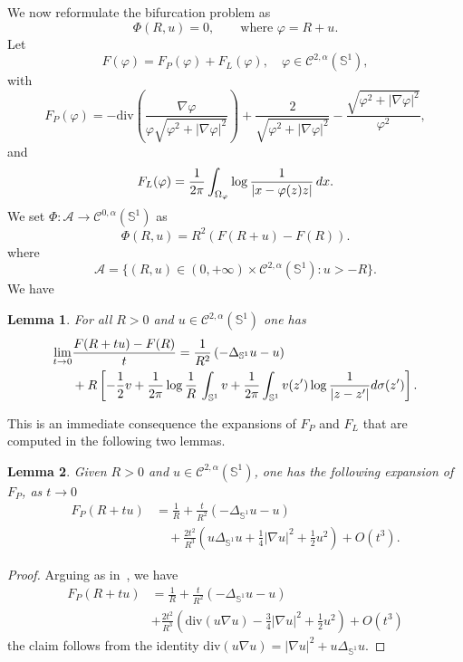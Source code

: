 \documentclass[10pt,reqno,english]{amsart}
\newcommand{\Su}{\mathbb{S}^1}
\newcommand{\be}{\begin{equation}}
\newcommand{\ee}{\end{equation}}
\newtheorem{lemma}{Lemma}[section]
\theoremstyle{definition}
\numberwithin{equation}{section}
\begin{document}
\medskip
We now reformulate the bifurcation problem as
\[
\Phi(R,u)=0, \qquad \text{where } \varphi = R + u .
\]
Let 
\[
F(\varphi)= F_P (\varphi ) + F_L  (\varphi), \quad \varphi\in\mathcal C^{2,\alpha}(\Su),
\]
with
\[
 F_P (\varphi )=    -\mathrm{div}\left(\frac{\nabla\varphi}{\varphi\sqrt{ \varphi^2 + |\nabla \varphi|^2}}\right)+\frac{2}{\sqrt{ \varphi^2 + |\nabla \varphi|^2}}-\frac{\sqrt{ \varphi^2 + |\nabla \varphi|^2}}{\varphi^2} ,
 \]
 and
 \[
 F_L  (\varphi)=  {1\over 2\pi} \int_{\Omega_\varphi}    \log {1 \over |x - \varphi (z)   z| }\, dx.
\]
We set $\Phi:\mathcal A\to\mathcal C^{0,\alpha}(\Su)$ as
\be
\label{defPhi2}
\Phi (R, u) = R^2 \left( F(R+u) - F(R) \right).
\ee
where
\[
\mathcal A=\{(R,u)\in(0,+\infty)\times\mathcal C^{2,\alpha}(\Su):u>-R\}.
\]
We have
\begin{lemma}
\label{lemma:der2D}
For all $R>0$ and $u\in\mathcal C^{2,\alpha}(\mathbb S^{1})$ one has
\begin{align*}
 \lim_{t\to0}&\frac{  F(R+tu)-F(R)}{t}=\frac{1}{R^2}\left(-\Delta_{\Su} u-u\right) \\&+ R \left[ -{1\over 2} v + {1\over 2\pi} \log {1\over R} \, \int_{\mathbb{S}^1} v + {1\over 2\pi}  \int_{\mathbb{S}^1} v(z') \log {1\over |z-z'|} d\sigma (z')\right].
 \end{align*}
\end{lemma}

This is an immediate consequence the expansions of $F_P$ and $F_L$ that are computed in the following two lemmas.


\begin{lemma}
\label{FP2ordine}
Given $R>0$ and $u\in\mathcal C^{2,\alpha}(\Su)$, one has the following expansion of $F_P$, as $t\to0$
  \begin{align*}
    F_P(R+tu)&=\frac{1}{R}+\frac{t}{R^2}\left(-\Delta_{\Su} u-u\right)\\
    &\quad+\frac{2t^2}{R^3}\left(u\Delta_{\Su} u+\frac{1}{4}|\nabla u|^2+\frac{1}{2}u^2\right)+O(t^3).
    \end{align*}
\end{lemma}
\begin{proof}
Arguing as in~\cite[Lemma 14]{Fr19}, we have
\begin{align*}
    F_P(R+tu)&=\frac{1}{R}+\frac{t}{R^2}\left(-\Delta_{\Su} u-u\right)\\
    &+\frac{2t^2}{R^3}\left(\mathrm{div}(u\nabla u)-\frac{3}{4}|\nabla u|^2+\frac{1}{2}u^2\right)+O(t^3)
\end{align*}
    the claim follows from the identity $\mathrm{div}(u\nabla u)=|\nabla u|^2+u\Delta_{\Su} u$.
\end{proof}
\end{document}
